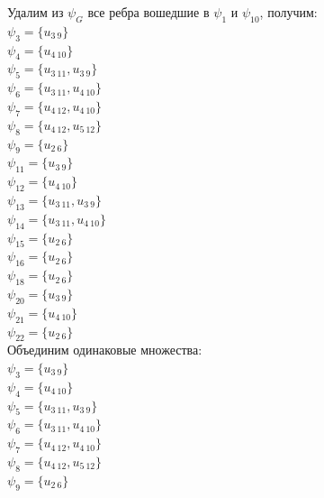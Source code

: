 \documentclass[a4paper,12pt]{article}
\begin{document}
\noindent
Удалим из $\psi_G$ все ребра вошедшие в $\psi_1$ и $\psi_{10}$, получим: \\
$\psi_{3} = \{u_{3\ 9}\}$\\
$\psi_{4} = \{u_{4\ 10}\}$\\
$\psi_{5} = \{u_{3\ 11},u_{3\ 9}\}$\\
$\psi_{6} = \{u_{3\ 11},u_{4\ 10}\}$\\
$\psi_{7} = \{u_{4\ 12},u_{4\ 10}\}$\\
$\psi_{8} = \{u_{4\ 12},u_{5\ 12}\}$\\
$\psi_{9} = \{u_{2\ 6}\}$\\
$\psi_{11} = \{u_{3\ 9}\}$\\
$\psi_{12} = \{u_{4\ 10}\}$\\
$\psi_{13} = \{u_{3\ 11},u_{3\ 9}\}$\\
$\psi_{14} = \{u_{3\ 11},u_{4\ 10}\}$\\
$\psi_{15} = \{u_{2\ 6}\}$\\
$\psi_{16} = \{u_{2\ 6}\}$\\
$\psi_{18} = \{u_{2\ 6}\}$\\
$\psi_{20} = \{u_{3\ 9}\}$\\
$\psi_{21} = \{u_{4\ 10}\}$\\
$\psi_{22} = \{u_{2\ 6}\}$\\
Объединим одинаковые множества: \\
$\psi_{3} = \{u_{3\ 9}\}$\\
$\psi_{4} = \{u_{4\ 10}\}$\\
$\psi_{5} = \{u_{3\ 11},u_{3\ 9}\}$\\
$\psi_{6} = \{u_{3\ 11},u_{4\ 10}\}$\\
$\psi_{7} = \{u_{4\ 12},u_{4\ 10}\}$\\
$\psi_{8} = \{u_{4\ 12},u_{5\ 12}\}$\\
$\psi_{9} = \{u_{2\ 6}\}$\\
\end{document}
